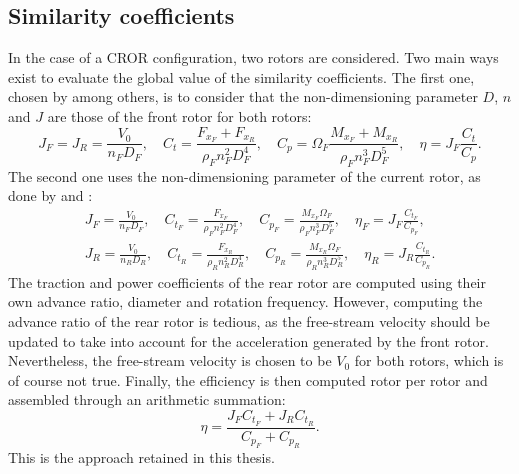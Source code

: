 \subsection{Similarity coefficients}
\label{sub:cror_similarity_coeff}

In the case of a CROR configuration, two rotors are considered.
Two main ways exist to evaluate the global value of the
similarity coefficients. The first one, chosen by
\citet{Bechet2011} among others, is to consider
that the non-dimensioning parameter $D$, $n$ and $J$ are those
of the front rotor for both rotors:
\begin{equation}
    J_F = J_R = \frac{V_0}{n_F D_F}, \quad
    C_t = \frac{F_{x_F} + F_{x_R}}{\rho_F n_F ^ 2  D_F ^ 4}, \quad
    C_p = \Omega_F \frac{M_{x_F} + M_{x_R}}{\rho_F n_F ^ 3 D_F ^ 5}, \quad
    \eta = J_F \frac{C_t}{C_p}.
\end{equation} 
The second one uses the non-dimensioning parameter of the current rotor,
as done by \citet{Stuermer2008} and \citet{Zachariadis2011}:
\begin{equation}
    \begin{split}
        J_F = \frac{V_0}{n_F D_F}, \quad
        C_{t_F} = \frac{F_{x_F}}{\rho_F n_F ^ 2  D_F ^ 4}, \quad
        C_{p_F} = \frac{M_{x_F}\Omega_F}{\rho_F n_F ^ 3 D_F ^ 5}, \quad
        \eta_F = J_F \frac{C_{t_F}}{C_{p_F}}, \\
        J_R = \frac{V_0}{n_R D_R}, \quad
        C_{t_R} = \frac{F_{x_R}}{\rho_R n_R ^ 2  D_R ^ 4}, \quad
        C_{p_R} = \frac{M_{x_R}\Omega_F}{\rho_R n_R ^ 3 D_R ^ 5}, \quad
        \eta_R = J_R \frac{C_{t_R}}{C_{p_R}}.
    \end{split}
\end{equation} 
The traction and power coefficients of the rear rotor are
computed using their own advance ratio, diameter and rotation frequency.
However, computing the advance ratio of the rear rotor is tedious, as
the free-stream velocity should be updated to take into account
for the acceleration generated by the front rotor. Nevertheless, the free-stream
velocity is chosen to be $V_0$ for both rotors, which is of course not true.
Finally, the efficiency is then computed rotor per rotor and
assembled through an arithmetic summation:
\begin{equation}
    \eta = \frac{J_F C_{t_F} + J_R C_{t_R}}{C_{p_F} + C_{p_R}}.
\end{equation}
This is the approach retained in this thesis.

